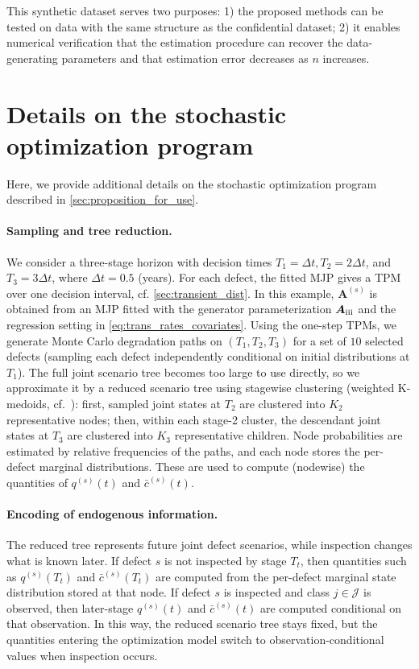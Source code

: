 \documentclass{article}
\newcommand{\RN}[1]{\textup{\uppercase\expandafter{\romannumeral#1}}}
\begin{document}
This synthetic dataset serves two purposes: 1) the proposed methods can be tested on data with the same structure as the confidential dataset; 2) it enables numerical verification that the estimation procedure can recover the data-generating parameters and that estimation error decreases as $n$ increases.




\newpage

\section{Details on the stochastic optimization program} \label{sec:stochastic_optimization_details}
Here, we provide additional details on the stochastic optimization program described in \cref{sec:proposition_for_use}.
\paragraph{Sampling and tree reduction.}
We consider a three-stage horizon with decision times
$T_1=\Delta t, T_2=2\Delta t$, and $T_3=3\Delta t$, where $\Delta t=0.5$ (years).
For each defect, the fitted MJP gives a TPM over one decision interval, cf. \cref{sec:transient_dist}. In this example, $\bm A^{(s)}$ is obtained from an MJP fitted with the generator parameterization $\bm{A}_{\RN{3}}$ and the regression setting in \cref{eq:trans_rates_covariates}.
Using the one-step TPMs, we generate Monte Carlo degradation paths on $(T_1,T_2,T_3)$ for a set of $10$ selected defects (sampling each defect independently conditional on initial distributions at $T_1$).
The full joint scenario tree becomes too large to use directly, so we approximate it by a reduced scenario tree using stagewise clustering (weighted K-medoids, cf.\ \citet{park2009a}): first, sampled joint states at $T_2$ are clustered into $K_2$ representative nodes; then, within each stage-2 cluster, the descendant joint states at $T_3$ are clustered into $K_3$ representative children.
Node probabilities are estimated by relative frequencies of the paths, and each node stores the per-defect marginal distributions. These are used to compute (nodewise) the quantities of $q^{(s)}(t)$ and $\bar c^{(s)}(t)$.

\paragraph{Encoding of endogenous information.}
The reduced tree represents future joint defect scenarios, while inspection changes what is known later.
If defect $s$ is not inspected by stage $T_t$, then quantities such as $q^{(s)}(T_t)$ and $\bar c^{(s)}(T_t)$ are computed from the per-defect marginal state distribution stored at that node.
If defect $s$ is inspected and class $j\in\mathcal J$ is observed, then later-stage $q^{(s)}(t)$ and $\bar c^{(s)}(t)$ are computed conditional on that observation.
In this way, the reduced scenario tree stays fixed, but the quantities entering the optimization model switch to observation-conditional values when inspection occurs.
\end{document}
